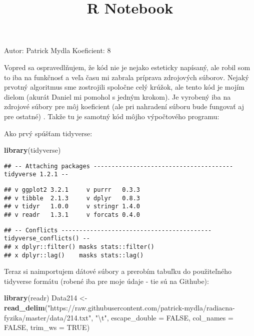 \documentclass[]{article}
\title{R Notebook}
\author{}
\date{}
\newenvironment{Shaded}{\begin{snugshade}}{\end{snugshade}}
\newcommand{\CharTok}[1]{\textcolor[rgb]{0.31,0.60,0.02}{#1}}
\newcommand{\DataTypeTok}[1]{\textcolor[rgb]{0.13,0.29,0.53}{#1}}
\newcommand{\KeywordTok}[1]{\textcolor[rgb]{0.13,0.29,0.53}{\textbf{#1}}}
\newcommand{\NormalTok}[1]{#1}
\newcommand{\OtherTok}[1]{\textcolor[rgb]{0.56,0.35,0.01}{#1}}
\newcommand{\StringTok}[1]{\textcolor[rgb]{0.31,0.60,0.02}{#1}}
\begin{document}
\maketitle

Autor: Patrick Mydla Koeficient: 8

Vopred sa ospravedlňujem, že kód nie je nejako esteticky napísaný, ale
robil som to iba na funkčnosť a veľa času mi zabrala príprava zdrojových
súborov. Nejaký prvotný algoritmus sme zostrojili spoločne celý krúžok,
ale tento kód je mojím dielom (akurát Daniel mi pomohol s jedným
krokom). Je vyrobený iba na zdrojové súbory pre môj koeficient (ale pri
nahradení súboru bude fungovať aj pre ostatné) . Takže tu je samotný kód
môjho výpočtového programu:

Ako prvý spúšťam tidyverse:

\begin{Shaded}
\begin{Highlighting}[]
\KeywordTok{library}\NormalTok{(tidyverse)}
\end{Highlighting}
\end{Shaded}

\begin{verbatim}
## -- Attaching packages --------------------------------------- tidyverse 1.2.1 --
\end{verbatim}

\begin{verbatim}
## v ggplot2 3.2.1     v purrr   0.3.3
## v tibble  2.1.3     v dplyr   0.8.3
## v tidyr   1.0.0     v stringr 1.4.0
## v readr   1.3.1     v forcats 0.4.0
\end{verbatim}

\begin{verbatim}
## -- Conflicts ------------------------------------------ tidyverse_conflicts() --
## x dplyr::filter() masks stats::filter()
## x dplyr::lag()    masks stats::lag()
\end{verbatim}

Teraz si naimportujem dátové súbory a prerobím tabuľku do použiteľného
tidyverse formátu (robené iba pre moje údaje - tie sú na Githube):

\begin{Shaded}
\begin{Highlighting}[]
\KeywordTok{library}\NormalTok{(readr)}
\NormalTok{Data214 <-}\StringTok{ }\KeywordTok{read_delim}\NormalTok{(}\StringTok{"https://raw.githubusercontent.com/patrick-mydla/radiacna-fyzika/master/data/214.txt"}\NormalTok{, }
    \StringTok{"}\CharTok{\textbackslash{}t}\StringTok{"}\NormalTok{, }\DataTypeTok{escape_double =} \OtherTok{FALSE}\NormalTok{, }\DataTypeTok{col_names =} \OtherTok{FALSE}\NormalTok{, }
    \DataTypeTok{trim_ws =} \OtherTok{TRUE}\NormalTok{)}
\end{Highlighting}
\end{Shaded}
\end{document}
